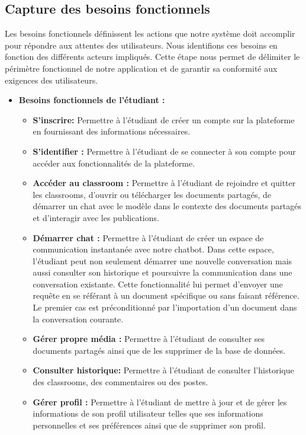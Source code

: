 \subsection{Capture des besoins fonctionnels}
\justifying
Les besoins fonctionnels définissent les actions que notre système doit accomplir pour répondre aux attentes des utilisateurs. Nous identifions ces besoins en fonction des différents acteurs impliqués. Cette étape nous permet de délimiter le périmètre fonctionnel de notre application et de garantir sa conformité aux exigences des utilisateurs.
\begin{itemize}[itemsep=2pt, parsep=2pt]
    \item \textbf{Besoins fonctionnels de l'étudiant :} 
    \begin{itemize}[itemsep=1pt, parsep=1pt]
        \item \textbf{S'inscrire: }Permettre à l'étudiant de créer un compte sur la plateforme en fournissant des informations nécessaires.
        \item \textbf{S'identifier : }Permettre à l’étudiant de se connecter à son compte pour accéder aux fonctionnalités de la plateforme.
        \item \textbf{Accéder au classroom : } Permettre à l'étudiant de rejoindre et quitter les classrooms, d’ouvrir ou télécharger les documents partagés, de démarrer un chat avec le modèle dans le contexte des documents partagés et d'interagir avec les publications.
        \item \textbf{Démarrer chat : }Permettre à l'étudiant de créer un espace de communication instantanée avec notre chatbot. Dans cette espace, l'étudiant peut non seulement démarrer une nouvelle conversation mais aussi consulter son historique et poursuivre la communication dans une conversation existante. Cette fonctionnalité lui permet d’envoyer une requête en se référant à un document spécifique ou sans faisant référence. Le premier cas est préconditionné par l’importation d’un document dans la conversation courante. 
        \item \textbf{Gérer propre média : }Permettre à l'étudiant de consulter ses documents partagés ainsi que de les supprimer de la base de données.
        \item \textbf{Consulter historique: }Permettre à l’étudiant de consulter l’historique des classrooms, des commentaires ou des postes.
        \item \textbf{Gérer profil : } Permettre à l'étudiant de mettre à jour et de gérer les informations de son profil utilisateur telles que ses informations personnelles et ses préférences ainsi que de supprimer son profil.

\end{itemize}
\end{itemize}

